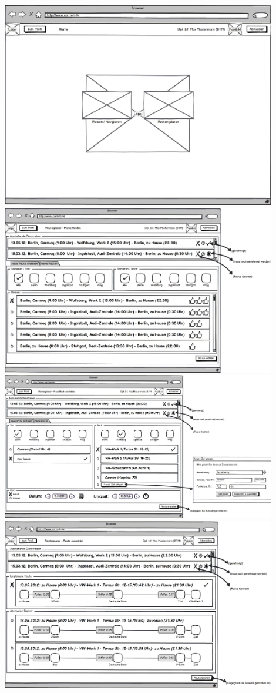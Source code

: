 \documentclass{article}
\begin{document}
\begin{center}
\includegraphics[width=12cm]{08_konvergenter_paperprototyp01_003.png}\\
\includegraphics[width=12cm]{08_konvergenter_paperprototyp01_004.png}\\
\includegraphics[width=12cm]{08_konvergenter_paperprototyp01_005.png}\\
\includegraphics[width=12cm]{08_konvergenter_paperprototyp01_006.png}\\

\end{center}
\end{document}
